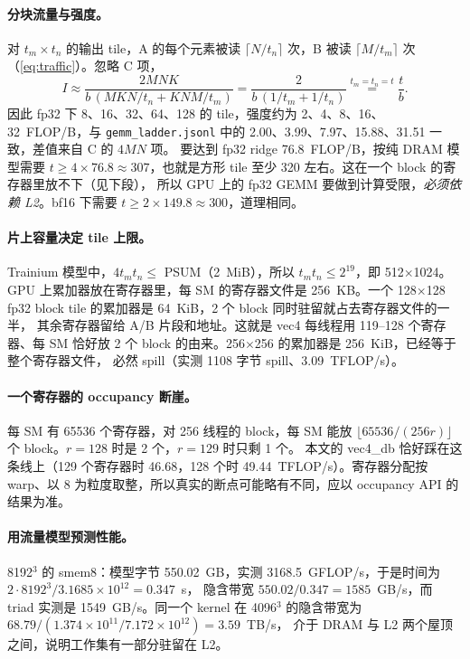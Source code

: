\documentclass[11pt,a4paper]{ctexart}
\begin{document}
\paragraph{分块流量与强度。} 对 $t_m\times t_n$ 的输出 tile，A 的每个元素被读 $\lceil N/t_n\rceil$ 次，B 被读 $\lceil M/t_m\rceil$ 次（\cref{eq:traffic}）。忽略 C 项，
\[
I \approx \frac{2MNK}{b\,(MKN/t_n + KNM/t_m)} = \frac{2}{b\,(1/t_m+1/t_n)} \overset{t_m=t_n=t}{=} \frac{t}{b}.
\]
因此 fp32 下 8、16、32、64、128 的 tile，强度约为 2、4、8、16、32~FLOP/B，与 \texttt{gemm\_ladder.jsonl} 中的 2.00、3.99、7.97、15.88、31.51 一致，差值来自 C 的 $4MN$ 项。
要达到 fp32 ridge 76.8~FLOP/B，按纯 DRAM 模型需要 $t\ge 4\times76.8\approx307$，也就是方形 tile 至少 320 左右。这在一个 block 的寄存器里放不下（见下段），
所以 GPU 上的 fp32 GEMM 要做到计算受限，\emph{必须依赖 L2}。bf16 下需要 $t\ge 2\times149.8\approx300$，道理相同。

\paragraph{片上容量决定 tile 上限。} Trainium 模型中，$4t_mt_n\le$ PSUM（2~MiB），所以 $t_mt_n\le 2^{19}$，即 512$\times$1024。
GPU 上累加器放在寄存器里，每 SM 的寄存器文件是 256~KB。一个 128$\times$128 fp32 block tile 的累加器是 64~KiB，2 个 block 同时驻留就占去寄存器文件的一半，
其余寄存器留给 A/B 片段和地址。这就是 vec4 每线程用 119--128 个寄存器、每 SM 恰好放 2 个 block 的由来。256$\times$256 的累加器是 256~KiB，已经等于整个寄存器文件，
必然 spill（实测 1108 字节 spill、3.09~TFLOP/s）。

\paragraph{一个寄存器的 occupancy 断崖。} 每 SM 有 65536 个寄存器，对 256 线程的 block，每 SM 能放 $\lfloor 65536/(256r)\rfloor$ 个 block。$r=128$ 时是 2 个，$r=129$ 时只剩 1 个。
本文的 vec4\_db 恰好踩在这条线上（129 个寄存器时 46.68，128 个时 49.44~TFLOP/s）。寄存器分配按 warp、以 8 为粒度取整，所以真实的断点可能略有不同，应以 occupancy API 的结果为准。

\paragraph{用流量模型预测性能。} 8192$^3$ 的 smem8：模型字节 550.02~GB，实测 3168.5~GFLOP/s，于是时间为 $2\cdot8192^3/3.1685\times10^{12}=0.347$~s，
隐含带宽 $550.02/0.347=1585$~GB/s，而 triad 实测是 1549~GB/s。同一个 kernel 在 4096$^3$ 的隐含带宽为 $68.79/(1.374\times10^{11}/7.172\times10^{12})=3.59$~TB/s，
介于 DRAM 与 L2 两个屋顶之间，说明工作集有一部分驻留在 L2。
\end{document}

